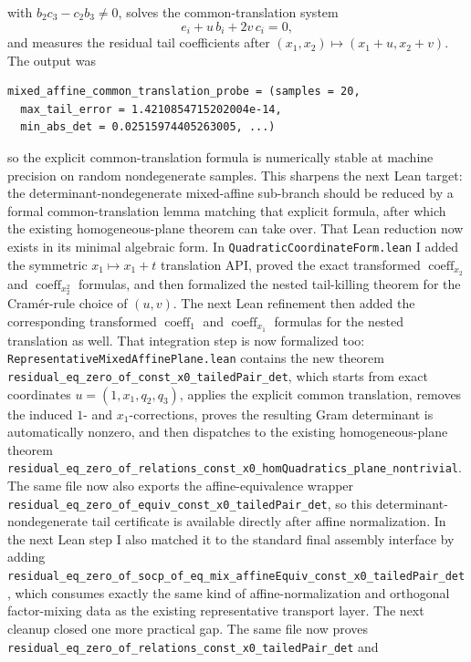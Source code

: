 \documentclass[11pt]{article}
\begin{document}
with
\(
  b_2c_3-c_2b_3 \neq 0
\),
solves the common-translation system
\[
  e_i + u\,b_i + 2v\,c_i = 0,
\]
and measures the residual tail coefficients after
\((x_1,x_2)\mapsto(x_1+u,x_2+v)\). The output was
\begin{verbatim}
mixed_affine_common_translation_probe = (samples = 20,
  max_tail_error = 1.4210854715202004e-14,
  min_abs_det = 0.02515974405263005, ...)
\end{verbatim}
so the explicit common-translation formula is numerically stable at machine
precision on random nondegenerate samples. This sharpens the next Lean target:
the determinant-nondegenerate mixed-affine sub-branch should be reduced by a
formal common-translation lemma matching that explicit formula, after which the
existing homogeneous-plane theorem can take over.
That Lean reduction now exists in its minimal algebraic form. In
\texttt{QuadraticCoordinateForm.lean} I added the symmetric
\(x_1 \mapsto x_1+t\) translation API, proved the exact transformed
\(\operatorname{coeff}_{x_2}\) and \(\operatorname{coeff}_{x_2^2}\) formulas,
and then formalized the nested tail-killing theorem for the Cramér-rule choice
of \((u,v)\). The next Lean refinement then added the corresponding transformed
\(\operatorname{coeff}_{1}\) and \(\operatorname{coeff}_{x_1}\) formulas for the
nested translation as well. That integration step is now formalized too:
\texttt{RepresentativeMixedAffinePlane.lean} contains the new theorem
\texttt{residual\_eq\_zero\_of\_const\_x0\_tailedPair\_det}, which starts from
exact coordinates \(u=(1,x_1,q_2,q_3)\), applies the explicit common
translation, removes the induced \(1\)- and \(x_1\)-corrections, proves the
resulting Gram determinant is automatically nonzero, and then dispatches to the
existing homogeneous-plane theorem
\texttt{residual\_eq\_zero\_of\_relations\_const\_x0\_homQuadratics\_plane\_nontrivial}.
The same file now also exports the affine-equivalence wrapper
\texttt{residual\_eq\_zero\_of\_equiv\_const\_x0\_tailedPair\_det}, so this
determinant-nondegenerate tail certificate is available directly after affine
normalization. In the next Lean step I also matched it to the standard final
assembly interface by adding
\texttt{residual\_eq\_zero\_of\_socp\_of\_eq\_mix\_affineEquiv\_const\_x0\_tailedPair\_det},
which consumes exactly the same kind of affine-normalization and orthogonal
factor-mixing data as the existing representative transport layer.
The next cleanup closed one more practical gap. The same file now proves
\texttt{residual\_eq\_zero\_of\_relations\_const\_x0\_tailedPair\_det} and
\end{document}
